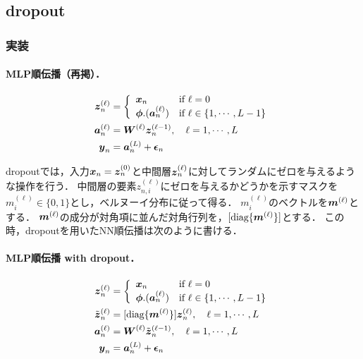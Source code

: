\subsection{dropout}
\subsubsection{実装}
\paragraph{MLP順伝播（再掲）．}
\begin{align*}
 \mbox{\boldmath $z$}^{(\ell)}_n &=
 \left\{
     \begin{array}{ll}
       \mbox{\boldmath $x$}_n & \mbox{if }\ell=0 \\
       \mbox{\boldmath $\phi$}.(\mbox{\boldmath $a$}^{(\ell)}_n) & \mbox{if }\ell \in \{1,\cdots,L-1 \}
     \end{array}
   \right.
   \\
 \mbox{\boldmath $a$}^{(\ell)}_n &= \mbox{\boldmath $W$}^{(\ell)}\mbox{\boldmath $z$}^{(\ell-1)}_n,~~~\ell=1,\cdots,L
 \\
 \mbox{\boldmath $y$}_n &= \mbox{\boldmath $a$}^{(L)}_n + \mbox{\boldmath $\epsilon$}_n
\end{align*}

dropoutでは，入力$\mbox{\boldmath $x$}_n=\mbox{\boldmath $z$}_n^{(0)}$と中間層$\mbox{\boldmath $z$}_n^{(\ell)}$に対してランダムにゼロを与えるような操作を行う．
中間層の要素$z_{n,i}^{(\ell)}$にゼロを与えるかどうかを示すマスクを$m_i^{(\ell)}\in\{0,1\}$とし，ベルヌーイ分布に従って得る．
$m_i^{(\ell)}$のベクトルを$\mbox{\boldmath $m$}^{(\ell)}$とする．
$\mbox{\boldmath $m$}^{(\ell)}$の成分が対角項に並んだ対角行列を，$[\mbox{diag}\{\mbox{\boldmath $m$}^{(\ell)}\}]$とする．
この時，dropoutを用いたNN順伝播は次のように書ける．


\paragraph{MLP順伝播 with dropout．}
\begin{align*}
 \mbox{\boldmath $z$}^{(\ell)}_n &=
 \left\{
     \begin{array}{ll}
       \mbox{\boldmath $x$}_n & \mbox{if }\ell=0 \\
       \mbox{\boldmath $\phi$}.(\mbox{\boldmath $a$}^{(\ell)}_n) & \mbox{if }\ell \in \{1,\cdots,L-1 \}
     \end{array}
   \right.
   \\
\tilde{\mbox{\boldmath $z$}}^{(\ell)}_n &= [\mbox{diag}\{\mbox{\boldmath $m$}^{(\ell)}\}]\mbox{\boldmath $z$}^{(\ell)}_n,~~~\ell=1,\cdots,L
\\
 \mbox{\boldmath $a$}^{(\ell)}_n &= \mbox{\boldmath $W$}^{(\ell)}\tilde{\mbox{\boldmath $z$}}^{(\ell-1)}_n,~~~\ell=1,\cdots,L
 \\
 \mbox{\boldmath $y$}_n &= \mbox{\boldmath $a$}^{(L)}_n + \mbox{\boldmath $\epsilon$}_n
\end{align*}


